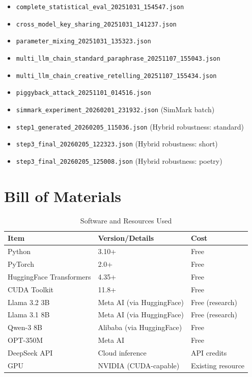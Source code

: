 \documentclass[12pt,letterpaper]{article}
\begin{document}
\begin{itemize}
    \item \texttt{complete\_statistical\_eval\_20251031\_154547.json}
    \item \texttt{cross\_model\_key\_sharing\_20251031\_141237.json}
    \item \texttt{parameter\_mixing\_20251031\_135323.json}
    \item \texttt{multi\_llm\_chain\_standard\_paraphrase\_20251107\_155043.json}
    \item \texttt{multi\_llm\_chain\_creative\_retelling\_20251107\_155434.json}
    \item \texttt{piggyback\_attack\_20251101\_014516.json}
    \item \texttt{simmark\_experiment\_20260201\_231932.json} (SimMark batch)
    \item \texttt{step1\_generated\_20260205\_115036.json} (Hybrid robustness: standard)
    \item \texttt{step3\_final\_20260205\_122323.json} (Hybrid robustness: short)
    \item \texttt{step3\_final\_20260205\_125008.json} (Hybrid robustness: poetry)
\end{itemize}

\section{Bill of Materials}

\begin{table}[H]
\centering
\caption{Software and Resources Used}
\begin{tabular}{lll}
\toprule
\textbf{Item} & \textbf{Version/Details} & \textbf{Cost} \\
\midrule
Python & 3.10+ & Free \\
PyTorch & 2.0+ & Free \\
HuggingFace Transformers & 4.35+ & Free \\
CUDA Toolkit & 11.8+ & Free \\
Llama 3.2 3B & Meta AI (via HuggingFace) & Free (research) \\
Llama 3.1 8B & Meta AI (via HuggingFace) & Free (research) \\
Qwen-3 8B & Alibaba (via HuggingFace) & Free \\
OPT-350M & Meta AI & Free \\
DeepSeek API & Cloud inference & API credits \\
\midrule
GPU & NVIDIA (CUDA-capable) & Existing resource \\
\bottomrule
\end{tabular}
\end{table}
\end{document}
